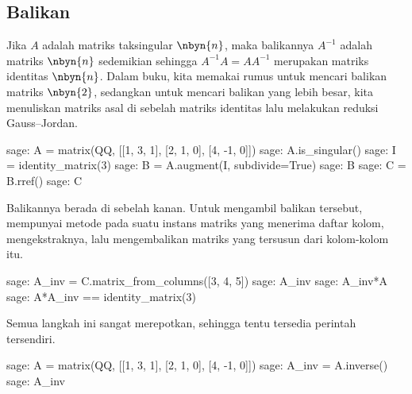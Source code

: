 \subsection{Balikan}
Jika $A$ adalah matriks taksingular $\nbyn{n}$, maka balikannya $A^{-1}$
adalah matriks $\nbyn{n}$ sedemikian sehingga $A^{-1}A=AA^{-1}$ merupakan
matriks identitas $\nbyn{n}$.
Dalam buku, kita memakai rumus untuk mencari balikan matriks $\nbyn{2}$,
sedangkan untuk mencari balikan yang lebih besar,
kita menuliskan matriks asal di sebelah matriks identitas
lalu melakukan reduksi Gauss--Jordan.
\begin{sagecommandline}
sage: A = matrix(QQ, [[1, 3, 1], [2, 1, 0], [4, -1, 0]])
sage: A.is_singular()
sage: I = identity_matrix(3)
sage: B = A.augment(I, subdivide=True)
sage: B
sage: C = B.rref()
sage: C
\end{sagecommandline}
Balikannya berada di sebelah kanan.
Untuk mengambil balikan tersebut,
\Sage{} mempunyai metode 
pada suatu instans matriks yang menerima daftar kolom,
mengekstraknya, lalu mengembalikan matriks yang tersusun dari kolom-kolom itu.
\begin{sagecommandline}
sage: A_inv = C.matrix_from_columns([3, 4, 5])
sage: A_inv
sage: A_inv*A
sage: A*A_inv == identity_matrix(3)
\end{sagecommandline}

Semua langkah ini sangat merepotkan, sehingga tentu tersedia
perintah tersendiri.
\begin{sagecommandline}[d,0,1]
sage: A = matrix(QQ, [[1, 3, 1], [2, 1, 0], [4, -1, 0]])
sage: A_inv = A.inverse()
sage: A_inv
\end{sagecommandline}

